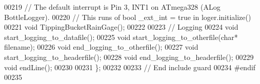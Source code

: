 \begin{DoxyCode}
00219     \textcolor{comment}{// The default interrupt is Pin 3, INT1 on ATmega328 (ALog BottleLogger).}
00220     \textcolor{comment}{// This runs of bool \_ext\_int = true in loger.initialize()}
00221     \textcolor{keywordtype}{void} TippingBucketRainGage();
00222     
00223     \textcolor{comment}{// Logging}
00224     \textcolor{keywordtype}{void} start\_logging\_to\_datafile();
00225     \textcolor{keywordtype}{void} start\_logging\_to\_otherfile(\textcolor{keywordtype}{char}* filename);
00226     \textcolor{keywordtype}{void} end\_logging\_to\_otherfile();
00227     \textcolor{keywordtype}{void} start\_logging\_to\_headerfile();
00228     \textcolor{keywordtype}{void} end\_logging\_to\_headerfile();
00229     \textcolor{keywordtype}{void} endLine();
00230 
00231 \};
00232 
00233 \textcolor{comment}{// End include guard}
00234 \textcolor{preprocessor}{#endif  }
00235 
\end{DoxyCode}
